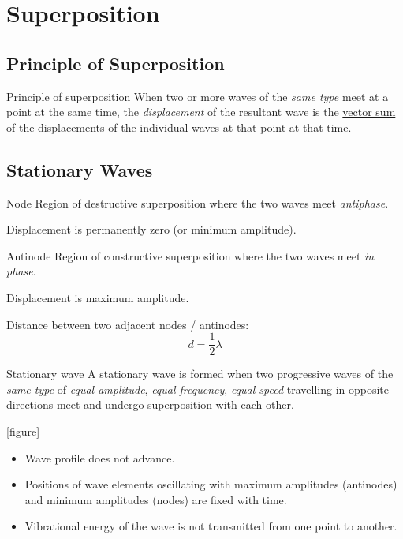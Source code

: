 \section{Superposition}
\subsection{Principle of Superposition}
\begin{defn}{Principle of superposition}{}
When two or more waves of the \emph{same type} meet at a point at the same time, the \emph{displacement} of the resultant wave is the \underline{vector sum} of the displacements of the individual waves at that point at that time.
\end{defn}

\subsection{Stationary Waves}
\begin{defn}{Node}{}
Region of destructive superposition where the two waves meet \emph{antiphase}.

Displacement is permanently zero (or minimum amplitude).
\end{defn}

\begin{defn}{Antinode}{}
Region of constructive superposition where the two waves meet \emph{in phase}.

Displacement is maximum amplitude.
\end{defn}

Distance between two adjacent nodes / antinodes:
\[ d=\frac{1}{2}\lambda \]

\begin{defn}{Stationary wave}{}
A stationary wave is formed when two progressive waves of the \emph{same type} of \emph{equal amplitude}, \emph{equal frequency}, \emph{equal speed} travelling in opposite directions meet and undergo superposition with each other.
\end{defn}

[figure]

\begin{itemize}
\item Wave profile does not advance.
\item Positions of wave elements oscillating with maximum amplitudes (antinodes) and minimum amplitudes (nodes) are fixed with time. 
\item Vibrational energy of the wave is not transmitted from one point to another.
\end{itemize}

